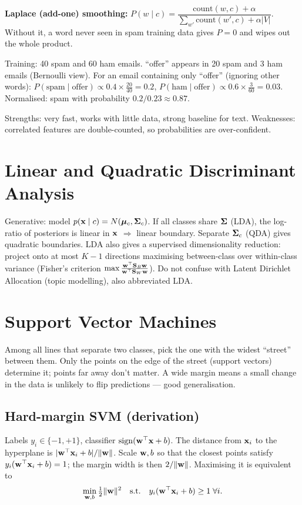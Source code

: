 \textbf{Laplace (add-one) smoothing:} $P(w\mid c)=\dfrac{\text{count}(w,c)+\alpha}{\sum_{w'}\text{count}(w',c)+\alpha|V|}$. Without it, a word never seen in spam training data gives $P=0$ and wipes out the whole product.

\begin{example}
Training: 40 spam and 60 ham emails. ``offer'' appears in 20 spam and 3 ham emails (Bernoulli view). For an email containing only ``offer'' (ignoring other words): $P(\text{spam}\mid\text{offer})\propto0.4\times\frac{20}{40}=0.2$, $P(\text{ham}\mid\text{offer})\propto0.6\times\frac{3}{60}=0.03$. Normalised: spam with probability $0.2/0.23\approx0.87$.
\end{example}

Strengths: very fast, works with little data, strong baseline for text. Weaknesses: correlated features are double-counted, so probabilities are over-confident.

\section{Linear and Quadratic Discriminant Analysis}
Generative: model $p(\mathbf{x}\mid c)=N(\bm{\mu}_c,\bm{\Sigma}_c)$. If all classes share $\bm{\Sigma}$ (LDA), the log-ratio of posteriors is linear in $\mathbf{x}$ $\Rightarrow$ linear boundary. Separate $\bm{\Sigma}_c$ (QDA) gives quadratic boundaries. LDA also gives a supervised dimensionality reduction: project onto at most $K-1$ directions maximising between-class over within-class variance (Fisher's criterion $\max\frac{\mathbf{w}^\top\mathbf{S}_B\mathbf{w}}{\mathbf{w}^\top\mathbf{S}_W\mathbf{w}}$). Do not confuse with Latent Dirichlet Allocation (topic modelling), also abbreviated LDA.

\section{Support Vector Machines}

\begin{intuition}
Among all lines that separate two classes, pick the one with the widest ``street'' between them. Only the points on the edge of the street (support vectors) determine it; points far away don't matter. A wide margin means a small change in the data is unlikely to flip predictions --- good generalisation.
\end{intuition}

\subsection{Hard-margin SVM (derivation)}
Labels $y_i\in\{-1,+1\}$, classifier $\operatorname{sign}(\mathbf{w}^\top\mathbf{x}+b)$. The distance from $\mathbf{x}_i$ to the hyperplane is $|\mathbf{w}^\top\mathbf{x}_i+b|/\|\mathbf{w}\|$. Scale $\mathbf{w},b$ so that the closest points satisfy $y_i(\mathbf{w}^\top\mathbf{x}_i+b)=1$; the margin width is then $2/\|\mathbf{w}\|$. Maximising it is equivalent to
\[\min_{\mathbf{w},b}\tfrac12\|\mathbf{w}\|^2\quad\text{s.t.}\quad y_i(\mathbf{w}^\top\mathbf{x}_i+b)\ge1\;\forall i.\]

